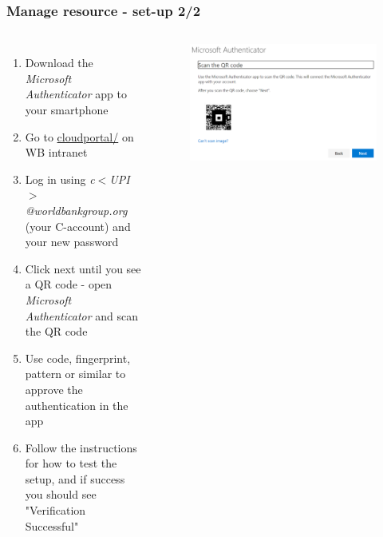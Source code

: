 \documentclass[aspectratio=169]{beamer} %
\begin{document}
\begin{frame}
	\frametitle{Manage resource - set-up 2/2}
	\begin{columns}[c]
		
		
		\begin{enumerate}
			\item Download the \textit{Microsoft Authenticator} app to your smartphone
			\item Go to \url{cloudportal/} on WB intranet
			\item Log in using \textit{c$<$UPI$>$@worldbankgroup.org} (your C-account) and your new password
			\item Click next until you see a QR code - open \textit{Microsoft Authenticator} and scan the QR code
			\item Use code, fingerprint, pattern or similar to approve the authentication in the app
			\item Follow the instructions for how to test the setup, and if success you should see "Verification Successful"
			
		\end{enumerate}
		
		\begin{figure}
			\centering
			\includegraphics[width=1\textwidth]{./img/microsoft-auth-1.png}
		\end{figure}
		
	\end{columns}
\end{frame}
\end{document}
